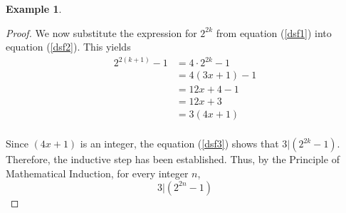 \documentclass{book}
\theoremstyle{definition}
\newtheorem{example}{Example}[definition]
\theoremstyle{remark}
\newcommand{\m}{\cdot}
\begin{document}
\begin{example}
\begin{proof}
    We now substitute the expression for $2^{2k}$ from equation (\ref{dsf1}) into equation (\ref{dsf2}). This yields
        \begin{align}
        \label{dsf3}
            2^{2(k+1)} - 1 & = 4 \m 2^{2k} - 1 \nonumber \\
                & =  4(3x+1) - 1 \nonumber \\
                & = 12x + 4 - 1 \nonumber \\
                & = 12x + 3 \nonumber \\
                & = 3(4x + 1) \\
        \end{align}
    
    Since $(4x+1)$ is an integer, the equation (\ref{dsf3}) shows that $3 | (2^{2k} -1)$. Therefore, the inductive step has been established. Thus, by the Principle of Mathematical Induction, for every integer $n$, 
        \begin{equation*}
            3 | (2^{2n} -1)
        \end{equation*}
 
\end{proof}
\end{example}
\end{document}
